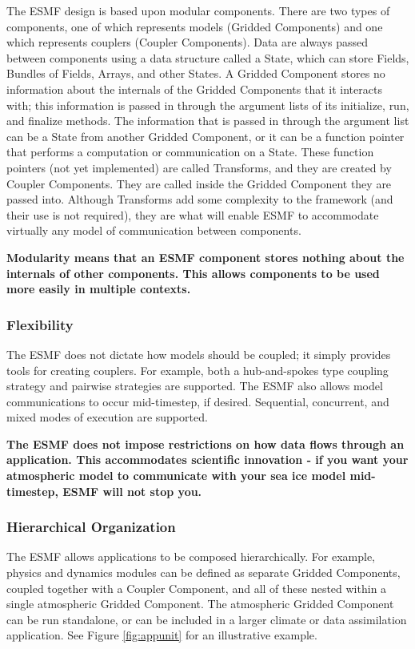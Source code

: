 The ESMF design is based upon modular components.  There
are two types of components, one of which represents models 
(Gridded Components) and one which represents couplers (Coupler Components).  
Data are always passed between components using a data structure 
called a State, which can store Fields, Bundles of Fields,
Arrays, and other States.  A Gridded Component stores no information about 
the internals of the Gridded Components that it interacts with; this information 
is passed in through the argument lists of its initialize, run, 
and finalize methods.  The information that is 
passed in through the argument list can be a State from 
another Gridded Component, or it can be a function pointer that performs
a computation or communication on a State.  These function 
pointers (not yet implemented) are called Transforms, and they 
are created by Coupler Components.  They are called inside the 
Gridded Component they are passed into.  Although Transforms add 
some complexity to the framework (and their use is not required), they are what will
enable ESMF to accommodate virtually any model of communication 
between components. 

{\bf Modularity means that an ESMF component stores nothing about 
the internals of other components.  This allows components to be 
used more easily in multiple contexts.}

\subsubsection{Flexibility}
The ESMF does not dictate how models should be coupled; it
simply provides tools for creating couplers.  For example, 
both a hub-and-spokes type coupling strategy and  
pairwise strategies are supported.  The ESMF also allows model
communications to occur mid-timestep, if desired.  Sequential, 
concurrent, and mixed modes of execution are supported.  

{\bf The ESMF does not impose restrictions on how data flows through 
an application.  This accommodates scientific innovation - if you 
want your atmospheric model to communicate with your sea ice model
mid-timestep, ESMF will not stop you.}

\subsubsection{Hierarchical Organization}
\label{sec:principles-hierarchy}
The ESMF allows applications to be composed hierarchically.
For example, physics and dynamics modules can be defined as 
separate Gridded Components, coupled together with a Coupler Component, and all
of these nested within a single atmospheric Gridded Component.
The atmospheric Gridded Component can be run standalone, or can be included
in a larger climate or data assimilation application.  See Figure
\ref{fig:appunit} for an illustrative example.

